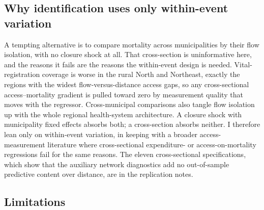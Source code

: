 

\subsection{Why identification uses only within-event variation}
\label{sec:discussion-crosssection}

A tempting alternative is to compare mortality across municipalities by
their flow isolation, with no closure shock at all. That cross-section is
uninformative here, and the reasons it fails are the reasons the
within-event design is needed. Vital-registration coverage is worse in the
rural North and Northeast, exactly the regions with the widest
flow-versus-distance access gaps, so any cross-sectional access--mortality
gradient is pulled toward zero by measurement quality that moves with the
regressor. Cross-municipal comparisons also tangle flow isolation up with
the whole regional health-system architecture. A closure shock with
municipality fixed effects absorbs both; a cross-section absorbs neither.
I therefore lean only on within-event variation, in keeping with a broader
access-measurement literature \citep{doyle2011} where cross-sectional
expenditure- or access-on-mortality regressions fail for the same reasons.
The eleven cross-sectional specifications, which show that the auxiliary
network diagnostics add no out-of-sample predictive content over distance,
are in the replication notes.

\subsection{Limitations}
\label{sec:discussion-limits}

